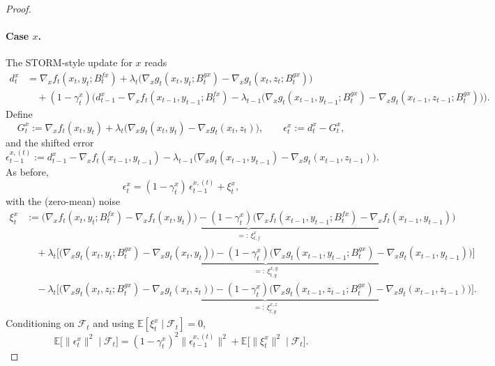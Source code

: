 \documentclass{uai2026} %
\newcommand{\EE}{\mathbb{E}}
\newcommand{\F}{\mathcal{F}}
\begin{document}
\begin{proof}
\paragraph{Case $x$.}
The STORM-style update for $x$ reads
\begin{align*}
d_t^x
&= \nabla_x f_t(x_t,y_t;B_t^{fx})
+ \lambda_t\Big(\nabla_x g_t(x_t,y_t;B_t^{gx})-\nabla_x g_t(x_t,z_t;B_t^{gx})\Big) \\
&\quad + (1-\gamma_t^x)\Big(d_{t-1}^x-\nabla_x f_t(x_{t-1},y_{t-1};B_t^{fx})
-\lambda_{t-1}\big(\nabla_x g_t(x_{t-1},y_{t-1};B_t^{gx})-\nabla_x g_t(x_{t-1},z_{t-1};B_t^{gx})\big)\Big).
\end{align*}
Define
\[
G_t^x:=\nabla_x f_t(x_t,y_t)+\lambda_{t}\big(\nabla_x g_t(x_t,y_t)-\nabla_x g_t(x_t,z_t)\big),\qquad
\epsilon_t^x:=d_t^x-G_t^x,
\]
and the shifted error
\[
\epsilon_{t-1}^{x,(t)}:=d_{t-1}^x-\nabla_x f_t(x_{t-1},y_{t-1})
-\lambda_{t-1}\big(\nabla_x g_t(x_{t-1},y_{t-1})-\nabla_x g_t(x_{t-1},z_{t-1})\big).
\]
As before,
\begin{equation}\label{eq:x-decomp}
\epsilon_t^x=(1-\gamma_t^x)\,\epsilon_{t-1}^{x,(t)}+\xi_t^x,
\end{equation}
with the (zero-mean) noise
\begin{align*}
\xi_t^x
&:=\underbrace{\big(\nabla_x f_t(x_t,y_t;B_t^{fx})-\nabla_x f_t(x_t,y_t)\big)
-(1-\gamma_t^x)\big(\nabla_x f_t(x_{t-1},y_{t-1};B_t^{fx})-\nabla_x f_t(x_{t-1},y_{t-1})\big)}_{=:\ \xi^{x}_{t,f}}\\
&\quad+\lambda_t\underbrace{\Big[\big(\nabla_x g_t(x_t,y_t;B_t^{gx})-\nabla_x g_t(x_t,y_t)\big)
-(1-\gamma_t^x)\big(\nabla_x g_t(x_{t-1},y_{t-1};B_t^{gx})-\nabla_x g_t(x_{t-1},y_{t-1})\big)\Big]}_{=:\ \xi^{x,y}_{t,g}}\\
&\quad-\lambda_t\underbrace{\Big[\big(\nabla_x g_t(x_t,z_t;B_t^{gx})-\nabla_x g_t(x_t,z_t)\big)
-(1-\gamma_t^x)\big(\nabla_x g_t(x_{t-1},z_{t-1};B_t^{gx})-\nabla_x g_t(x_{t-1},z_{t-1})\big)\Big]}_{=:\ \xi^{x,z}_{t,g}}.
\end{align*}
Conditioning on $\F_t$ and using $\EE[\xi_t^x\mid\F_t]=0$,
\begin{equation}\label{eq:x-mse-basic}
\EE\!\big[\|\epsilon_t^x\|^2\mid\F_t\big]
=(1-\gamma_t^x)^2\|\epsilon_{t-1}^{x,(t)}\|^2+\EE\!\big[\|\xi_t^x\|^2\mid\F_t\big].
\end{equation}


\end{proof}
\end{document}
